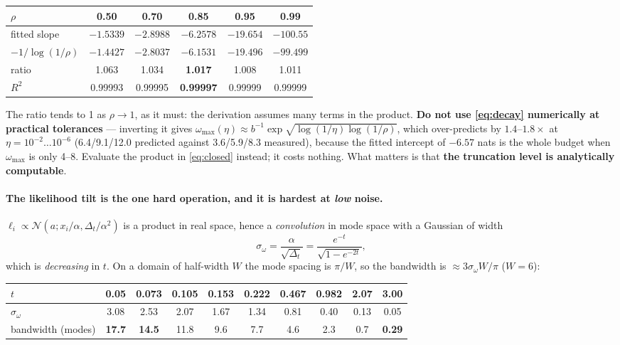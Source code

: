 \documentclass[10pt,a4paper]{article}
\newcommand{\corr}{\rho}
\newcommand{\Dt}{\Delta_t}
\newcommand{\st}[1]{\textbf{#1}}
\begin{document}
\medskip
\noindent\begin{tabular}{@{}l ccccc@{}}
\toprule
$\corr$ & 0.50 & 0.70 & 0.85 & 0.95 & 0.99 \\
\midrule
fitted slope & $-1.5339$ & $-2.8988$ & $-6.2578$ & $-19.654$ & $-100.55$ \\
$-1/\log(1/\corr)$ & $-1.4427$ & $-2.8037$ & $-6.1531$ & $-19.496$ & $-99.499$ \\
ratio & 1.063 & 1.034 & \st{1.017} & 1.008 & 1.011 \\
$R^2$ & 0.99993 & 0.99995 & \st{0.99997} & 0.99999 & 0.99999 \\
\bottomrule
\end{tabular}

\medskip
The ratio tends to 1 as $\corr\to1$, as it must: the derivation assumes many terms in the
product. \st{Do not use \eqref{eq:decay} numerically at practical tolerances} --- inverting it
gives $\omega_{\max}(\eta)\approx b^{-1}\exp\sqrt{\log(1/\eta)\log(1/\corr)}$, which
over-predicts by $1.4$--$1.8\times$ at $\eta = 10^{-2}\ldots10^{-6}$ (6.4/9.1/12.0 predicted
against 3.6/5.9/8.3 measured), because the fitted intercept of $-6.57$ nats is the whole budget
when $\omega_{\max}$ is only 4--8. Evaluate the product in \eqref{eq:closed} instead; it costs
nothing. What matters is that \st{the truncation level is analytically computable}.

\paragraph{The likelihood tilt is the one hard operation, and it is hardest at \emph{low} noise.}
$\ell_i \propto \mathcal N(a; x_i/\alpha, \Dt/\alpha^2)$ is a product in real space, hence a
\emph{convolution} in mode space with a Gaussian of width
\[
\sigma_\omega = \frac{\alpha}{\sqrt{\Dt}} = \frac{e^{-t}}{\sqrt{1-e^{-2t}}},
\]
which is \emph{decreasing} in $t$. On a domain of half-width $W$ the mode spacing is $\pi/W$,
so the bandwidth is $\approx 3\sigma_\omega W/\pi$ ($W=6$):

\medskip
\noindent\begin{tabular}{@{}l ccccccccc@{}}
\toprule
$t$ & 0.05 & 0.073 & 0.105 & 0.153 & 0.222 & 0.467 & 0.982 & 2.07 & 3.00 \\
\midrule
$\sigma_\omega$ & 3.08 & 2.53 & 2.07 & 1.67 & 1.34 & 0.81 & 0.40 & 0.13 & 0.05 \\
bandwidth (modes) & \st{17.7} & \st{14.5} & 11.8 & 9.6 & 7.7 & 4.6 & 2.3 & 0.7 & \st{0.29} \\
\bottomrule
\end{tabular}
\end{document}
